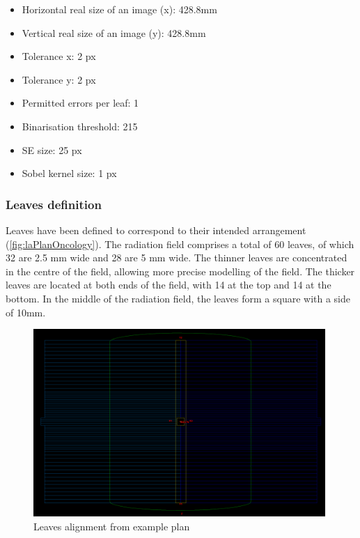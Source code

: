 \begin{itemize}

    \item Horizontal real size of an image (x): 428.8mm

    \item Vertical real size of an image (y): 428.8mm
    
    \item Tolerance x: 2 px

    \item Tolerance y: 2 px

    \item Permitted errors per leaf: 1

    \item Binarisation threshold: 215

    \item SE size: 25 px

    \item Sobel kernel size: 1 px
    
\end{itemize}

\subsubsection{Leaves definition}

Leaves have been defined to correspond to their intended arrangement (\autoref{fig:laPlanOncology}). The radiation field comprises a total of 60 leaves, of which 32 are 2.5 mm wide and 28 are 5 mm wide. The thinner leaves are concentrated in the centre of the field, allowing more precise modelling of the field. The thicker leaves are located at both ends of the field, with 14 at the top and 14 at the bottom. In the middle of the radiation field, the leaves form a square with a side of 10mm.

\begin{figure}[H]
    \centering
    \includegraphics[width=1\textwidth]{Content/Images/analysis_la_plan.png}
    \caption{Leaves alignment from example plan}
    \label{fig:laPlanOncology}
\end{figure}

